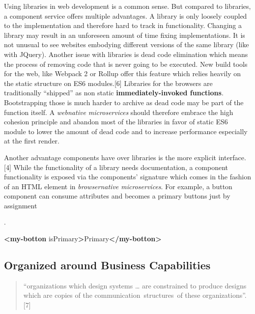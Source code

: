 \documentclass[]{article}
\newenvironment{Shaded}{}{}
\newcommand{\KeywordTok}[1]{\textcolor[rgb]{0.00,0.44,0.13}{\textbf{{#1}}}}
\newcommand{\OtherTok}[1]{\textcolor[rgb]{0.00,0.44,0.13}{{#1}}}
\newcommand{\NormalTok}[1]{{#1}}
\begin{document}
Using libraries in web development is a common sense. But compared to
libraries, a component service offers multiple advantages. A library is
only loosely coupled to the implementation and therefore hard to track
in functionality. Changing a library may result in an unforeseen amount
of time fixing implementations. It is not unusual to see websites
embodying different versions of the same library (like with JQuery).
Another issue with libraries is dead code elimination which means the
process of removing code that is never going to be executed. New build
tools for the web, like Webpack 2 or Rollup offer this feature which
relies heavily on the static structure on ES6 modules.{[}6{]} Libraries
for the browsers are traditionally ``shipped'' as non static
\textbf{immediately-invoked functions}. Bootstrapping those is much
harder to archive as dead code may be part of the function itself. A
\emph{webnative microservices} should therefore embrace the high
cohesion principle and abandon most of the libraries in favor of static
ES6 module to lower the amount of dead code and to increase performance
especially at the first render.

Another advantage components have over libraries is the more explicit
interface.{[}4{]} While the functionality of a library needs
documentation, a component functionality is exposed via the components'
signature which comes in the fashion of an HTML element in
\emph{browsernative microservices}. For example, a button component can
consume attributes and becomes a primary buttons just by assignment

.

\begin{Shaded}
\begin{Highlighting}[]
\KeywordTok{<my-botton}\OtherTok{ isPrimary}\KeywordTok{>}\NormalTok{Primary}\KeywordTok{</my-botton>}
\end{Highlighting}
\end{Shaded}

\subsection{Organized around Business
Capabilities}\label{organized-around-business-capabilities}

\begin{quote}
``organizations which design systems \ldots{} are constrained to produce
designs which are copies of the communication~structures~of these
organizations''. {[}7{]}
\end{quote}
\end{document}
